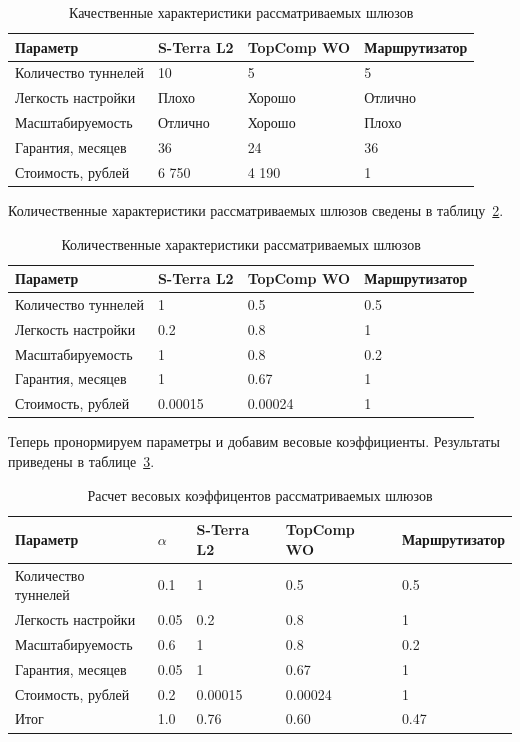\documentclass[russian,utf8,emptystyle]{eskdtext}
\begin{document}
\begin{longtable}{p{7cm}|p{2cm}|p{2cm}|p{2cm}}
\caption{Качественные характеристики рассматриваемых шлюзов}
\label{tab:vpn-1} \\
Параметр                     & S-Terra L2 & TopComp WO & Маршрутизатор \\ 
\hline 
Количество туннелей          & 10         & 5          & 5        \\ 
Легкость настройки           & Плохо      & Хорошо     & Отлично  \\ 
Масштабируемость             & Отлично    & Хорошо     & Плохо    \\ 
Гарантия, месяцев            & 36         & 24         & 36       \\ 
Стоимость, рублей            & 6 750      & 4 190      & 1        \\
\end{longtable}

Количественные характеристики рассматриваемых шлюзов сведены в таблицу~\ref{tab:vpn-2}.

\begin{longtable}{p{7cm}|p{2cm}|p{2cm}|p{2cm}}
\caption{Количественные характеристики рассматриваемых шлюзов}
\label{tab:vpn-2} \\
Параметр                     & S-Terra L2 & TopComp WO & Маршрутизатор \\ 
\hline 
Количество туннелей          & 1          & 0.5        & 0.5        \\ 
Легкость настройки           & 0.2        & 0.8        & 1       \\ 
Масштабируемость             & 1          & 0.8        & 0.2    \\ 
Гарантия, месяцев            & 1          & 0.67       & 1       \\ 
Стоимость, рублей            & 0.00015    & 0.00024    & 1        \\
\end{longtable}

Теперь пронормируем параметры и добавим весовые коэффициенты. Результаты приведены в таблице~\ref{tab:vpn-3}.
\begin{longtable}{p{7cm}|p{1cm}|p{2cm}|p{2cm}|p{2cm}}
\caption{Расчет весовых коэффицентов рассматриваемых шлюзов}
\label{tab:vpn-3} \\
Параметр                     & $\alpha$ & S-Terra L2 & TopComp WO & Маршрутизатор \\ 
\hline 
Количество туннелей          & 0.1      & 1          & 0.5        & 0.5        \\ 
Легкость настройки           & 0.05     & 0.2        & 0.8        & 1       \\ 
Масштабируемость             & 0.6      & 1          & 0.8        & 0.2    \\ 
Гарантия, месяцев            & 0.05     & 1          & 0.67       & 1       \\ 
Стоимость, рублей            & 0.2      & 0.00015    & 0.00024    & 1        \\
\hline
Итог						 & 1.0      & 0.76       & 0.60       & 0.47
\end{longtable}
\end{document}
